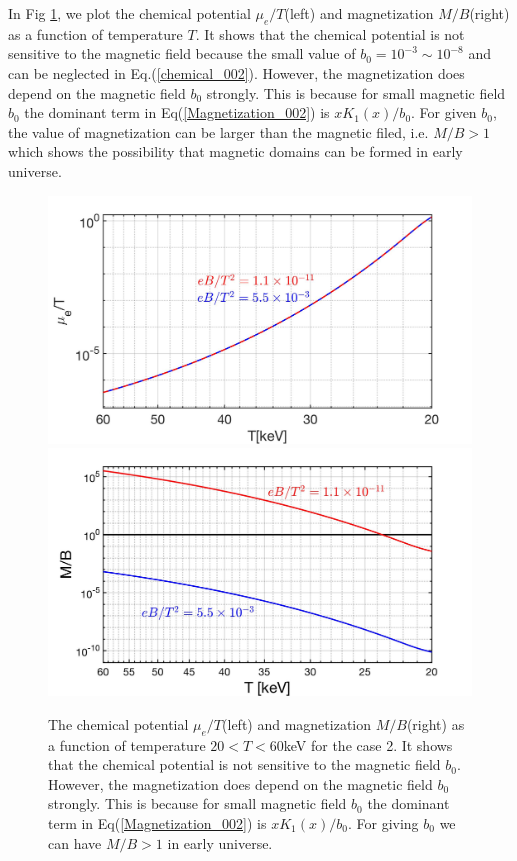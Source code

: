 \documentclass[Universe,article,submit,moreauthors,pdftex]{Definitions/mdpi}
\begin{document}
\begin{itemize}
In Fig {\ref{Case2_fig}}, we plot the chemical potential $\mu_e/T$(left) and magnetization $M/B$(right) as a function of temperature $T$. It shows that the chemical potential is not sensitive to the magnetic field because the small value of $b_0=10^{-3}\sim10^{-8}$ and can be neglected in Eq.(\ref{chemical_002}). However, the magnetization does depend on the magnetic field $b_0$ strongly. This is because for small magnetic field $b_0$ the dominant term in Eq(\ref{Magnetization_002}) is $xK_1(x)/b_0$. For given $b_0$, the value of magnetization can be larger than the magnetic filed, i.e. $M/B>1$  which shows the possibility that magnetic domains can be formed in early universe.

\begin{figure}[h]
\centering
\includegraphics[width=0.5\linewidth]{ChemicalPotential_case2.jpg}\includegraphics[width=0.5\linewidth]{Magnetization_case2.jpg}
\caption{The chemical potential $\mu_e/T$(left) and magnetization $M/B$(right) as a function of temperature $20<T<60$keV  for the case 2.  It shows that the chemical potential is not sensitive to the magnetic field $b_0$. However, the magnetization does depend on the magnetic field $b_0$ strongly. This is because for small magnetic field $b_0$ the dominant term in Eq(\ref{Magnetization_002}) is $xK_1(x)/b_0$. For giving $b_0$  we can have $M/B>1$ in early universe.}
\label{Case2_fig} 
\end{figure}

\end{itemize}
\end{document}
